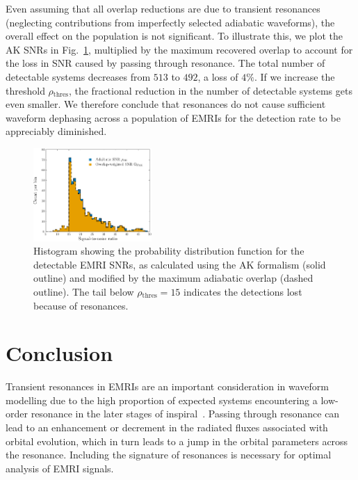 \documentclass[aps,prd,amsfonts,amssymb,amsmath,nofootinbib,showpacs,superscriptaddress,twocolumn,floatfix]{revtex4-1}
\newcommand{\figref}[1]{Fig.~\ref{fig:#1}}
\newcommand{\sub}[1]{\ensuremath{_\mathrm{#1}}}
\begin{document}
Even assuming that all overlap reductions are due to transient resonances (neglecting contributions from imperfectly selected adiabatic waveforms), the overall effect on the population is not significant. To illustrate this, we plot the AK SNRs in \figref{pop-SNR-dist}, multiplied by the maximum recovered overlap to account for the loss in SNR caused by passing through resonance. The total number of detectable systems decreases from $513$ to $492$, a loss of $4\%$. If we increase the threshold $\rho\sub{thres}$, the fractional reduction in the number of detectable systems gets even smaller. We therefore conclude that resonances do not cause sufficient waveform dephasing across a population of EMRIs for the detection rate to be appreciably diminished.

\begin{figure}
\centering
\includegraphics[width=0.4\textwidth]{Fig_res_pop_SNR_overlap}
\caption{\label{fig:pop-SNR-dist}Histogram showing the probability distribution function for the detectable EMRI SNRs, as calculated using the AK formalism (solid outline) and modified by the maximum adiabatic overlap (dashed outline). The tail below $\rho\sub{thres} = 15$ indicates the detections lost because of resonances.}
\end{figure}

\section{Conclusion}
\label{sec:conclusion}

Transient resonances in EMRIs are an important consideration in waveform modelling due to the high proportion of expected systems encountering a low-order resonance in the later stages of inspiral~\cite{Ruangsri2014}. Passing through resonance can lead to an enhancement or decrement in the radiated fluxes associated with orbital evolution, which in turn leads to a jump in the orbital parameters across the resonance. Including the signature of resonances is necessary for optimal analysis of EMRI signals. 
\end{document}
